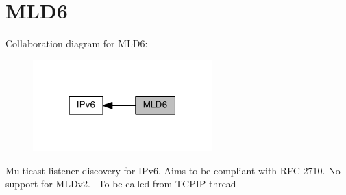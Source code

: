 \hypertarget{group__mld6}{}\section{M\+L\+D6}
\label{group__mld6}
Collaboration diagram for M\+L\+D6\+:
\nopagebreak
\begin{figure}[H]
\begin{center}
\leavevmode
\includegraphics[width=196pt]{group__mld6}
\end{center}
\end{figure}
Multicast listener discovery for I\+Pv6. Aims to be compliant with R\+FC 2710. No support for M\+L\+Dv2.~\newline
To be called from T\+C\+P\+IP thread 